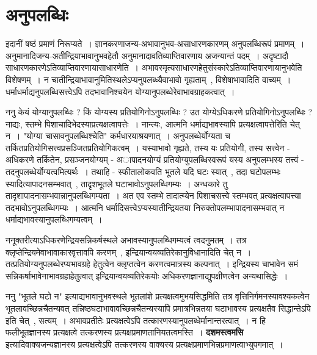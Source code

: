 \section{अनुपलब्धिः}
	इदानीं षष्ठं प्रमाणं निरूप्यते~। ज्ञानकरणाजन्य-अभावानुभव-असाधारणकारणम् अनुपलब्धिरूपं प्रमाणम्~। अनुमानादिजन्य-अतीन्द्रियाभावानुभवहेतौ अनुमानादावतिव्याप्तिवारणाय अजन्यान्तं पदम्~। अदृष्टादौ साधारणकारणेऽतिव्याप्तिवारणायासाधारणेति~। अभावस्मृत्यसाधारणहेतुसंस्कारेऽतिव्याप्तिवारणायानुभवेति विशेषणम्~। न चातीन्द्रियाभावानुमितिस्थलेऽप्यनुपलब्ध्यैवाभावो गृह्यताम्~, विशेषाभावादिति वाच्यम्~। धर्माधर्माद्यनुपलब्धिसत्त्वेऽपि तदभावानिश्चयेन योग्यानुपलब्धेरेवाभावग्राहकत्वात्~।\par
	ननु केयं योग्यानुपलब्धिः ? किं योग्यस्य प्रतियोगिनोऽनुपलब्धिः ? उत योग्येऽधिकरणे प्रतियोगिनोऽनुपलब्धिः ? नाद्यः, स्तम्भे पिशाचादिभेदस्याप्रत्यक्षत्वापत्तेः~। नान्त्यः, आत्मनि धर्माद्यभावस्यापि प्रत्यक्षत्वापत्तेरिति चेत् न~। "योग्या चासावनुपलब्धिश्चेति" कर्मधारयाश्रयणात्~। अनुपलब्धेर्योग्यता च तर्कितप्रतियोगिसत्त्वप्रसञ्जितप्रतियोगिकत्वम्~। यस्याभावो गृह्यते, तस्य यः प्रतियोगी, तस्य सत्त्वेन - अधिकरणे तर्कितेन, प्रसञ्जनयोग्यम् - अापादनयोग्यं प्रतियोग्युपलब्धिस्वरूपं यस्य अनुपलम्भस्य तत्त्वं - तदनुपलब्धेर्योग्यत्वमित्यर्थः~। तथाहि - स्फीतालोकवति भूतले यदि घटः स्यात्~, तदा घटोपलम्भः स्यादित्यापादनसम्भवात्~, तादृशभूतले घटाभावोऽनुपलब्धिगम्यः~। अन्धकारे तु तादृशापादनासम्भवान्नानुपलब्धिगम्यता~। अत एव स्तम्भे तादात्म्येन पिशाचसत्त्वे स्तम्भवत् प्रत्यक्षत्वापत्त्या तदभावोऽनुपलब्धिगम्यः~। आत्मनि धर्मादिसत्त्वेऽप्यस्यातीन्द्रियतया निरुक्तोपलम्भापादनासम्भवात् न धर्माद्यभावस्यानुपलब्धिगम्यत्वम्~।\par
	ननूक्तरीत्याऽधिकरणेन्द्रियसन्निकर्षस्थले अभावस्यानुपलब्धिगम्यत्वं त्वदनुमतम्~। तत्र क्लृप्तेन्द्रियमेवाभावाकारवृत्तावपि करणम्~, इन्द्रियान्वयव्यतिरेकानुविधानादिति चेत् न~। तत्प्रतियोग्यनुपलब्धेरप्यभावग्रहे हेतुत्वेन क्लृप्तत्वेन करणत्वमात्रस्य कल्पनात्~। इन्द्रियस्य चाभावेन समं सन्निकर्षाभावेनाभावग्रहाहेतुत्वात् इन्द्रियान्वयव्यतिरेकयोः अधिकरणज्ञानाद्युपक्षीणत्वेन अन्यथासिद्धेः~।\par
	ननु "भूतले घटो न" इत्याद्यभावानुभवस्थले भूतलांशे प्रत्यक्षत्वमुभयसिद्धमिति तत्र वृत्तिनिर्गमनस्यावश्यकत्वेन भूतलावच्छिन्नचैतन्यवत् तन्निष्ठघटाभावावच्छिन्नचैतन्यस्यापि प्रमात्रभिन्नतया घटाभावस्य प्रत्यक्षतैव सिद्धान्तेऽपि इति चेत्~, सत्यम्~। अभावप्रतीतेः प्रत्यक्षत्वेऽपि तत्कारणस्यानुपलब्धेर्मानान्तरत्वात्~। न हि फलीभूतज्ञानस्य प्रत्यक्षत्वे तत्करणस्य प्रत्यक्षप्रमाणतानियतत्वमस्ति~। {\bfseries दशमस्त्वमसि} इत्यादिवाक्यजन्यज्ञानस्य प्रत्यक्षत्वेऽपि तत्करणस्य वाक्यस्य प्रत्यक्षप्रमाणभिन्नप्रमाणत्वाभ्युपगमात्~।\par
